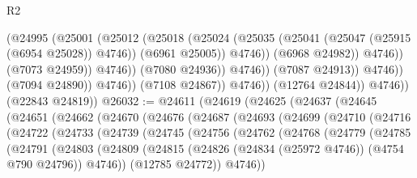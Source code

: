 \begin{lexlean}{R2}
\begin{coremodule}
                                          (@24995
                                            (@25001
                                              (@25012
                                                (@25018
                                                  (@25024
                                                    (@25035
                                                      (@25041
                                                        (@25047 (@25915 (@6954 @25028)) @4746))
                                                      (@6961 @25005))
                                                    @4746))
                                                (@6968 @24982))
                                              @4746))
                                          (@7073 @24959))
                                        @4746))
                                    (@7080 @24936))
                                  @4746))
                              (@7087 @24913))
                            @4746))
                        (@7094 @24890))
                      @4746))
                  (@7108 @24867))
                @4746))
            (@12764 @24844))
          @4746))
      (@22843 @24819))
@26032 := @24611
    (@24619
      (@24625
        (@24637
          (@24645
            (@24651
              (@24662
                (@24670
                  (@24676
                    (@24687
                      (@24693
                        (@24699
                          (@24710
                            (@24716
                              (@24722
                                (@24733
                                  (@24739
                                    (@24745
                                      (@24756
                                        (@24762
                                          (@24768
                                            (@24779
                                              (@24785
                                                (@24791
                                                  (@24803
                                                    (@24809
                                                      (@24815
                                                        (@24826
                                                          (@24834 (@25972 @4746))
                                                          (@4754 @790 @24796))
                                                        @4746))
                                                    (@12785 @24772))
                                                  @4746))

\end{coremodule}
\end{lexlean}

